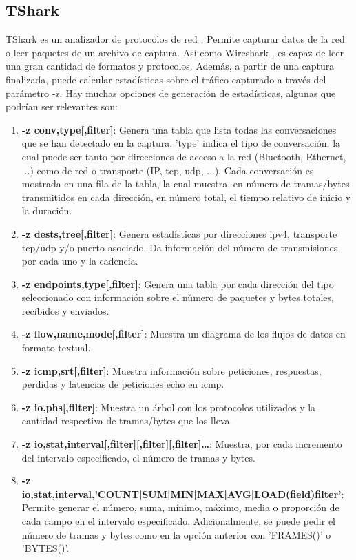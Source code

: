 \subsection{TShark}\label{tshark}

TShark es un analizador de protocolos de red \cite{tsharkmanual}. Permite capturar datos de la red o leer paquetes de un archivo de captura. Así como Wireshark \cite{wsharkmanual}, es capaz de leer una gran cantidad de formatos y protocolos. Además, a partir de una captura finalizada, puede calcular estadísticas sobre el tráfico capturado a través del parámetro -z. Hay muchas opciones de generación de estadísticas, algunas que podrían ser relevantes son:

\begin{enumerate} 
    \item \textbf{-z conv,type[,filter]}: Genera una tabla que lista todas las conversaciones que se han detectado en la captura. 'type' indica el tipo de conversación, la cual puede ser tanto por direcciones de acceso a la red (Bluetooth, Ethernet, ...) como de red o transporte (IP, \acrshort{tcp}, \acrshort{udp}, ...). Cada conversación es mostrada en una fila de la tabla, la cual muestra, en número de tramas/bytes transmitidos en cada dirección, en número total, el tiempo relativo de inicio y la duración.
    \item \textbf{-z dests,tree[,filter]}: Genera estadísticas por direcciones \acrshort{ipv4}, transporte \acrshort{tcp}/\acrshort{udp} y/o puerto asociado. Da información del número de transmisiones por cada uno y la cadencia.
    \item \textbf{-z endpoints,type[,filter]}: Genera una tabla por cada dirección del tipo seleccionado con información sobre el número de paquetes y bytes totales, recibidos y enviados.
    \item \textbf{-z flow,name,mode[,filter]}: Muestra un diagrama de los flujos de datos en formato textual.
    \item \textbf{-z icmp,srt[,filter]}: Muestra información sobre peticiones, respuestas, perdidas y latencias de peticiones echo en \acrshort{icmp}.
    \item \textbf{-z io,phs[,filter]}: Muestra un árbol con los protocolos utilizados y la cantidad respectiva de tramas/bytes que los lleva.
    \item \textbf{-z io,stat,interval[,filter][,filter][,filter]…​}: Muestra, por cada incremento del intervalo especificado, el número de tramas y bytes. 
    \item \textbf{-z io,stat,interval,'COUNT|SUM|MIN|MAX|AVG|LOAD(field)filter'}: Permite generar el número, suma, mínimo, máximo, media o proporción de cada campo en el intervalo especificado. Adicionalmente, se puede pedir el número de tramas y bytes como en la opción anterior con 'FRAMES()' o 'BYTES()'.

\end{enumerate}
